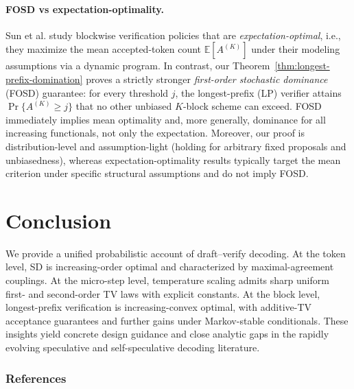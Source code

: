 \documentclass[twoside]{article}
\theoremstyle{plain}
\theoremstyle{definition}
\theoremstyle{remark}
\newcommand{\E}{\mathbb{E}}
\begin{document}
\paragraph{FOSD vs expectation-optimality.} Sun et al. \cite{Sun2024BlockVerification} study blockwise verification policies that are \emph{expectation-optimal}, i.e., they maximize the mean accepted-token count $\E[A^{(K)}]$ under their modeling assumptions via a dynamic program. In contrast, our Theorem~\ref{thm:longest-prefix-domination} proves a strictly stronger \emph{first-order stochastic dominance} (FOSD) guarantee: for every threshold $j$, the longest-prefix (LP) verifier attains $\Pr\{A^{(K)}\ge j\}$ that no other unbiased $K$-block scheme can exceed. FOSD immediately implies mean optimality and, more generally, dominance for all increasing functionals, not only the expectation. Moreover, our proof is distribution-level and assumption-light (holding for arbitrary fixed proposals and unbiasedness), whereas expectation-optimality results typically target the mean criterion under specific structural assumptions and do not imply FOSD.

\section{Conclusion}
We provide a unified probabilistic account of draft--verify decoding. At the token level, SD is increasing-order optimal and characterized by maximal-agreement couplings. At the micro-step level, temperature scaling admits sharp uniform first- and second-order TV laws with explicit constants. At the block level, longest-prefix verification is increasing-convex optimal, with additive-TV acceptance guarantees and further gains under Markov-stable conditionals. These insights yield concrete design guidance and close analytic gaps in the rapidly evolving speculative and self-speculative decoding literature.

\subsubsection*{References}

\end{document}
